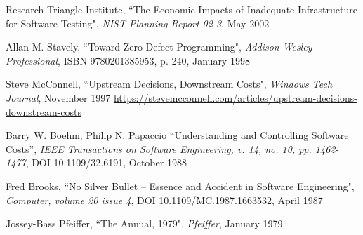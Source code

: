 \begin{thebibliography}{100}
 Research Triangle Institute, ``The Economic Impacts of Inadequate Infrastructure for 
Software Testing", \emph{NIST Planning Report 02-3}, May 2002

 Allan M. Stavely, ``Toward Zero-Defect Programming", \emph{Addison-Wesley Professional}, 
ISBN 9780201385953, p. 240, January 1998

 Steve McConnell, ``Upstream Decisions, Downstream Costs", \emph{Windows Tech Journal}, November 1997
\href{https://stevemcconnell.com/articles/upstream-decisions-downstream-costs}{https://stevemcconnell.com/articles/upstream-decisions-downstream-costs}

 Barry W. Boehm, Philip N. Papaccio ``Understanding and Controlling Software Costs”,
\emph{IEEE Transactions on Software Engineering, v. 14, no. 10, pp. 1462-1477}, DOI 10.1109/32.6191, October 1988

 Fred Brooks, ``No Silver Bullet -- Essence and Accident in Software Engineering", 
\emph{Computer, volume 20 issue 4}, DOI 10.1109/MC.1987.1663532, April 1987

 Jossey-Bass Pfeiffer, ``The Annual, 1979", \emph{Pfeiffer}, January 1979

\end{thebibliography}
